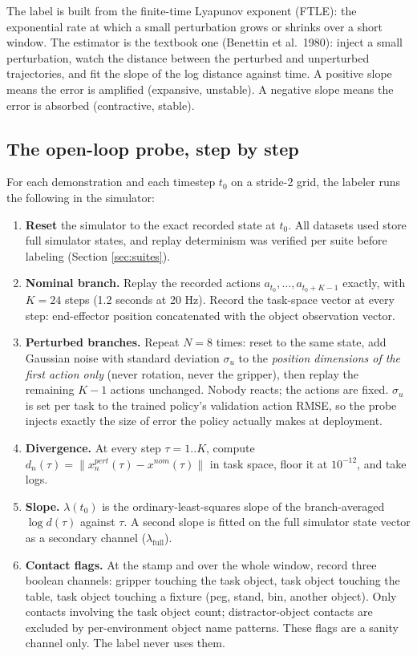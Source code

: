 \documentclass[11pt]{article}
\begin{document}
The label is built from the finite-time Lyapunov exponent (FTLE): the exponential rate
at which a small perturbation grows or shrinks over a short window. The estimator is
the textbook one (Benettin et al.\ 1980): inject a small perturbation, watch the
distance between the perturbed and unperturbed trajectories, and fit the slope of the
log distance against time. A positive slope means the error is amplified (expansive,
unstable). A negative slope means the error is absorbed (contractive, stable).

\subsection{The open-loop probe, step by step}

For each demonstration and each timestep $t_0$ on a stride-2 grid, the labeler runs
the following in the simulator:

\begin{enumerate}[leftmargin=2em]
  \item \textbf{Reset} the simulator to the exact recorded state at $t_0$. All
        datasets used store full simulator states, and replay determinism was
        verified per suite before labeling (Section \ref{sec:suites}).
  \item \textbf{Nominal branch.} Replay the recorded actions
        $a_{t_0}, \dots, a_{t_0+K-1}$ exactly, with $K = 24$ steps (1.2 seconds at
        20 Hz). Record the task-space vector at every step: end-effector position
        concatenated with the object observation vector.
  \item \textbf{Perturbed branches.} Repeat $N = 8$ times: reset to the same state,
        add Gaussian noise with standard deviation $\sigma_u$ to the \emph{position
        dimensions of the first action only} (never rotation, never the gripper),
        then replay the remaining $K-1$ actions unchanged. Nobody reacts; the actions
        are fixed. $\sigma_u$ is set per task to the trained policy's validation
        action RMSE, so the probe injects exactly the size of error the policy
        actually makes at deployment.
  \item \textbf{Divergence.} At every step $\tau = 1..K$, compute
        $d_n(\tau) = \lVert x^{pert}_n(\tau) - x^{nom}(\tau) \rVert$ in task space,
        floor it at $10^{-12}$, and take logs.
  \item \textbf{Slope.} $\lambda(t_0)$ is the ordinary-least-squares slope of the
        branch-averaged $\log d(\tau)$ against $\tau$. A second slope is fitted on
        the full simulator state vector as a secondary channel
        ($\lambda_{\mathrm{full}}$).
  \item \textbf{Contact flags.} At the stamp and over the whole window, record three
        boolean channels: gripper touching the task object, task object touching the
        table, task object touching a fixture (peg, stand, bin, another object).
        Only contacts involving the task object count; distractor-object contacts
        are excluded by per-environment object name patterns. These flags are a
        sanity channel only. The label never uses them.
\end{enumerate}
\end{document}
